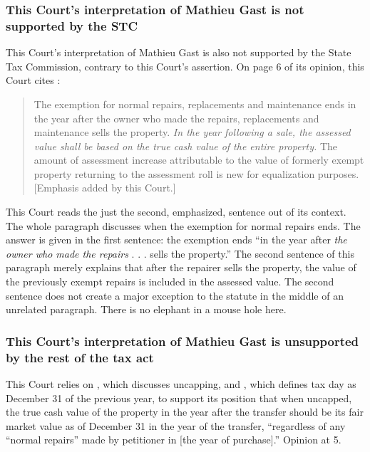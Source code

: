 \documentclass[12pt,\documentclassflag]{michiganCourtOfAppealsBrief}
\begin{document}
\subsubsection{This Court's interpretation of Mathieu Gast is not supported by the STC}

This Court's interpretation of Mathieu Gast is also not supported by the State Tax Commission, contrary to this Court's assertion. On page 6 of its opinion, this Court cites :

\begin{quote}
The exemption for normal repairs, replacements and maintenance ends in the year after the
owner who made the repairs, replacements and maintenance sells the property. \emph{In the year
following a sale, the assessed value shall be based on the true cash value of the entire property.}
The amount of assessment increase attributable to the value of formerly exempt property
returning to the assessment roll is new for equalization purposes. [Emphasis added by this Court.]
\end{quote}

This Court reads the just the second, emphasized, sentence out of its context. The whole paragraph discusses when the exemption for normal repairs ends. The answer is given in the first sentence: the exemption ends ``in the year after \emph{the owner who made the repairs} . . . sells the property.'' The second sentence of this paragraph merely explains that after the repairer sells the property, the value of the previously exempt repairs is included in the assessed value. The second sentence does not create a major exception to the statute in the middle of an unrelated paragraph. There is no elephant in a mouse hole here.

\subsubsection{This Court's interpretation of Mathieu Gast is unsupported by the rest of the tax act}


This Court relies on \cite[s]{MCL 211.27a(3)}, which discusses uncapping, and \cite[s]{MCL 211.2(2)}, which defines tax day as December 31 of the previous year, to support its position that when uncapped, the true cash value of the property in the year after the transfer should be its fair market value as of December 31 in the year of the transfer, ``regardless of any ``normal repairs'' made by petitioner in [the year of purchase].'' 
Opinion at 5.
\end{document}
